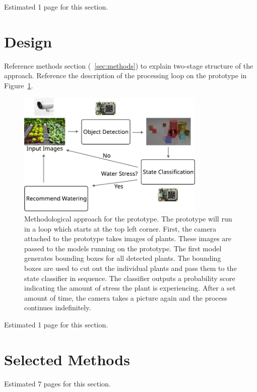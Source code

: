 \documentclass[draft,final]{vutinfth} %
\begin{document}
Estimated 1 page for this section.

\section{Design}
\label{sec:design}

Reference methods section (~\ref{sec:methods}) to explain two-stage
structure of the approach. Reference the description of the processing
loop on the prototype in Figure~\ref{fig:setup}.

\begin{figure}
  \centering
  \includegraphics[width=0.8\textwidth]{graphics/setup.pdf}
  \caption[Methodological approach for the prototype.]{Methodological
    approach for the prototype. The prototype will run in a loop which
    starts at the top left corner. First, the camera attached to the
    prototype takes images of plants. These images are passed to the
    models running on the prototype. The first model generates
    bounding boxes for all detected plants. The bounding boxes are
    used to cut out the individual plants and pass them to the state
    classifier in sequence. The classifier outputs a probability score
    indicating the amount of stress the plant is experiencing. After a
    set amount of time, the camera takes a picture again and the
    process continues indefinitely.}
  \label{fig:setup}
\end{figure}

Estimated 1 page for this section.

\section{Selected Methods}
\label{sec:selected-methods}

Estimated 7 pages for this section.
\end{document}
